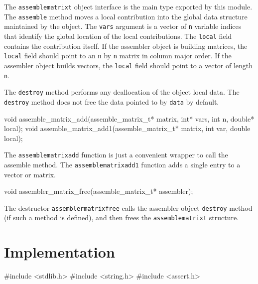 The {\tt{}assemble{}matrix{}t} object interface is the main type
exported by this module.  The {\tt{}assemble} method
moves a local contribution into the global data structure
maintained by the object.  The {\tt{}vars} argument is a vector
of {\tt{}n} variable indices that identify the global location
of the local contributions.  The {\tt{}local} field contains
the contribution itself.  If the assembler object is building
matrices, the {\tt{}local} field should point to an {\tt{}n} by {\tt{}n}
matrix in column major order.  If the assembler object builds
vectors, the {\tt{}local} field should point to a vector of length
{\tt{}n}.

The {\tt{}destroy} method performs any deallocation of the object
local data.  The {\tt{}destroy} method does not free the data pointed
to by {\tt{}data} by default.

\nwenddocs{}\endmoddef
void assemble_matrix_add(assemble_matrix_t* matrix, int* vars, int n, 
                         double* local);
void assemble_matrix_add1(assemble_matrix_t* matrix, int var, double local);

\nwendcode{}\nwdocspar

The {\tt{}assemble{}matrix{}add} function is just a convenient wrapper
to call the assemble method.  The {\tt{}assemble{}matrix{}add1} function
adds a single entry to a vector or matrix.

\nwenddocs{}\plusendmoddef
void assembler_matrix_free(assemble_matrix_t* assembler);
\nwendcode{}\nwdocspar

The destructor {\tt{}assembler{}matrix{}free} calls the assembler
object {\tt{}destroy} method (if such a method is defined),
and then frees the {\tt{}assemble{}matrix{}t} structure.


\section{Implementation}

\nwenddocs{}\endmoddef
#include <stdlib.h>
#include <string.h>
#include <assert.h>

